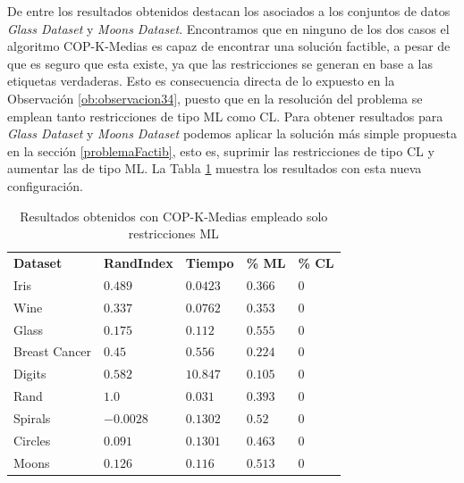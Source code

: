 De entre los resultados obtenidos destacan los asociados a los conjuntos de datos \textit{Glass Dataset} y \textit{Moons Dataset}. Encontramos que en ninguno de los dos casos el algoritmo COP-K-Medias es capaz de encontrar una solución factible, a pesar de que es seguro que esta existe, ya que las restricciones se generan en base a las etiquetas verdaderas. Esto es consecuencia directa de lo expuesto en la Observación \ref{ob:observacion34}, puesto que en la resolución del problema se emplean tanto restricciones de tipo \acs{ML} como \acs{CL}. Para obtener resultados para \textit{Glass Dataset} y \textit{Moons Dataset} podemos aplicar la solución más simple propuesta en la sección \ref{problemaFactib}, esto es, suprimir las restricciones de tipo \acs{CL} y aumentar las de tipo \acs{ML}. La Tabla \ref{tab:tabla6} muestra los resultados con esta nueva configuración.

\begin{table}[!h]
	\centering
	\setlength{\arrayrulewidth}{1mm}
	\setlength{\tabcolsep}{10pt}
	\renewcommand{\arraystretch}{0.75}
	
	\begin{tabular}{ >{\centering\arraybackslash}m{2.5cm}  >{\centering\arraybackslash}m{1.8cm}>{\centering\arraybackslash}m{1.5cm}>{\centering\arraybackslash}m{1.2cm}>{\centering\arraybackslash}m{1.2cm}}
		\hline
		\rowcolor{black}
		\multicolumn{5}{c}{\bf \color{white}{Resultados de COP-K-Medias con restricciones ML}}\\
		\hline
		\rowcolor{gray!50}
		\textbf{Dataset} & \textbf{RandIndex} & \textbf{Tiempo} & \textbf{\% ML} & \textbf{\% CL}  \\
		Iris & $0.489$ & $0.0423$ & $0.366$ & $0$ \\
		Wine & $0.337$ & $0.0762$ & $0.353$ & $0$ \\
		Glass & $0.175$ & $0.112$ & $0.555$ & $0$ \\
		Breast Cancer & $0.45$ & $0.556$ & $0.224$ & $0$ \\
		Digits & $0.582$ & $10.847$ & $0.105$ & $0$ \\
		Rand & $1.0$ & $0.031$ & $0.393$ & $0$ \\
		Spirals & $-0.0028$ & $0.1302$ & $0.52$ & $0$ \\
		Circles & $0.091$ & $0.1301$ & $0.463$ & $0$ \\
		Moons & $0.126$ & $0.116$ & $0.513$ & $0$ \\
		\hline
		
	\end{tabular}
	\caption{Resultados obtenidos con COP-K-Medias empleado solo restricciones \acs{ML}}
	\label{tab:tabla6}
\end{table}

